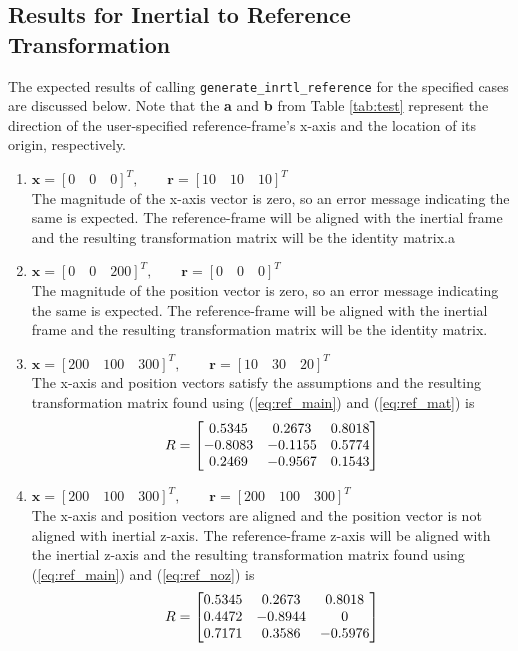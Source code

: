 \documentclass[11pt,fleqn]{report}
\begin{document}
\subsection{Results for Inertial to Reference Transformation}
The expected results of calling \texttt{generate\_inrtl\_reference} for
the specified cases are discussed below. Note that the \textbf{a} and
\textbf{b} from Table \ref{tab:test} represent the direction of the
user-specified reference-frame's x-axis and the location of its origin,
respectively.
\begin{enumerate}
 \item $\textbf{x} = [0 \quad 0 \quad 0]^T, \qquad
\textbf{r} = [10 \quad 10 \quad 10]^T$ \\
 The magnitude of the x-axis vector is zero, so an error message
 indicating the same is expected. The reference-frame will be aligned
 with the inertial frame and the resulting transformation matrix will
 be the identity matrix.a

 \setcounter{enumi}{3}
 \item $\textbf{x} = [0 \quad 0 \quad 200]^T, \qquad
\textbf{r} = [0 \quad 0 \quad 0]^T$ \\
 The magnitude of the position vector is zero, so an error message
 indicating the same is expected. The reference-frame will be
 aligned with the inertial frame and the resulting transformation
 matrix will be the identity matrix.

 \item $\textbf{x} = [200 \quad 100 \quad 300]^T, \qquad
\textbf{r} = [10 \quad 30 \quad 20]^T$ \\
 The x-axis and position vectors satisfy the assumptions and the
 resulting transformation matrix found using (\ref{eq:ref_main})
 and (\ref{eq:ref_mat}) is
 \begin{equation*}
\hfill R = \begin{bmatrix} 0.5345 & 0.2673 & 0.8018 \\
-0.8083 & -0.1155 & 0.5774 \\
 0.2469 & -0.9567 & 0.1543
 \end{bmatrix} \hfill
 \end{equation*}

\item $\textbf{x} = [200 \quad 100 \quad 300]^T, \qquad
 \textbf{r} = [200 \quad 100 \quad 300]^T$ \\
 The x-axis and position vectors are aligned and the position vector
 is not aligned with inertial z-axis. The reference-frame z-axis will
 be aligned with the inertial z-axis and the resulting transformation
 matrix found using (\ref{eq:ref_main}) and (\ref{eq:ref_noz}) is
 \begin{equation*}
\hfill R = \begin{bmatrix} 0.5345 & 0.2673& 0.8018 \\
 0.4472 & -0.8944 & 0 \\
 0.7171 & 0.3586& -0.5976
 \end{bmatrix} \hfill
 \end{equation*}


\end{enumerate}
\end{document}
